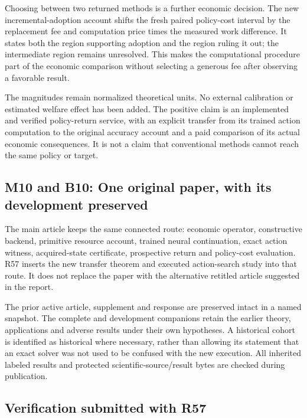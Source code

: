 \documentclass[ecta,nameyear,draft]{econsocart}
\begin{document}
Choosing between two returned methods is a further economic decision.
The new incremental-adoption account shifts the fresh paired policy-cost
interval by the replacement fee and computation price times the measured
work difference. It states both the region supporting adoption and the
region ruling it out; the intermediate region remains unresolved. This
makes the computational procedure part of the economic comparison
without selecting a generous fee after observing a favorable result.

The magnitudes remain normalized theoretical units. No external
calibration or estimated welfare effect has been added. The positive
claim is an implemented and verified policy-return service, with an
explicit transfer from its trained action computation to the original
accuracy account and a paid comparison of its actual economic
consequences. It is not a claim that conventional methods cannot reach
the same policy or target.

\hypertarget{m10-and-b10-one-original-paper-with-its-development-preserved}{%
\subsection{M10 and B10: One original paper, with its development
preserved}\label{m10-and-b10-one-original-paper-with-its-development-preserved}}

The main article keeps the same connected route: economic operator,
constructive backend, primitive resource account, trained neural
continuation, exact action witness, acquired-state certificate,
prospective return and policy-cost evaluation. R57 inserts the new
transfer theorem and executed action-search study into that route. It
does not replace the paper with the alternative retitled article
suggested in the report.

The prior active article, supplement and response are preserved intact
in a named snapshot. The complete and development companions retain the
earlier theory, applications and adverse results under their own
hypotheses. A historical cohort is identified as historical where
necessary, rather than allowing its statement that an exact solver was
not used to be confused with the new execution. All inherited labeled
results and protected scientific-source/result bytes are checked during
publication.

\hypertarget{verification-submitted-with-r57}{%
\subsection{Verification submitted with
R57}\label{verification-submitted-with-r57}}
\end{document}
